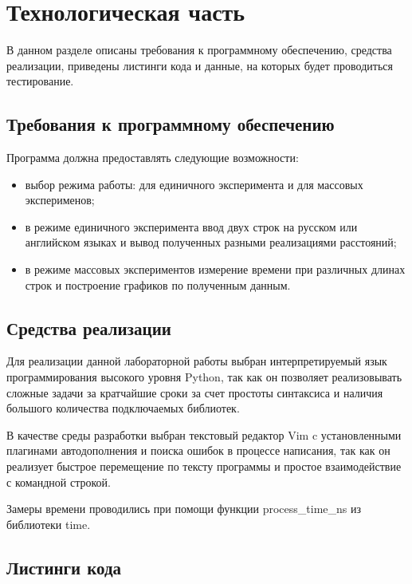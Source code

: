 \chapter{Технологическая часть}

В данном разделе описаны требования к программному обеспечению, средства
реализации, приведены листинги кода и данные, на которых будет проводиться
тестирование.

\section{Требования к программному обеспечению}

Программа должна предоставлять следующие возможности:
\begin{itemize}[left=\parindent]
    \item выбор режима работы: для единичного эксперимента и для массовых
          эксперименов;
    \item в режиме единичного эксперимента ввод двух строк на русском или
          английском языках и вывод полученных разными реализациями расстояний;
    \item в режиме массовых экспериментов измерение времени при различных
          длинах строк и построение графиков по полученным данным.
\end{itemize}

\section{Средства реализации}

Для реализации данной лабораторной работы выбран интерпретируемый язык
программирования высокого уровня Python\cite{python}, так как он позволяет
реализовывать сложные задачи за кратчайшие сроки за счет простоты синтаксиса и
наличия большого количества подключаемых библиотек. 

В качестве среды разработки выбран текстовый редактор Vim\cite{vim} c
установленными плагинами автодополнения и поиска ошибок в процессе написания,
так как он реализует быстрое перемещение по тексту программы и простое
взаимодействие с командной строкой.

Замеры времени проводились при помощи функции process\_time\_ns из библиотеки
time\cite{time}.

\section{Листинги кода}

